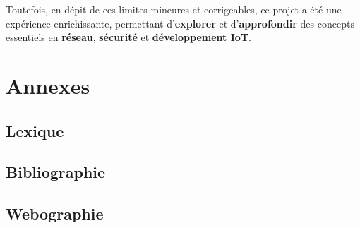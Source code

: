 \documentclass[10pt, a4paper]{report}
\begin{document}
	Toutefois, en dépit de ces limites mineures et corrigeables, ce projet a été une expérience enrichissante, permettant d’\textbf{explorer} et d’\textbf{approfondir} des concepts essentiels en \textbf{réseau}, \textbf{sécurité} et \textbf{développement IoT}.	
	
	\appendix
	\chapter{Annexes}
	\section{Lexique}
	\section{Bibliographie}
	\section{Webographie}
	
	
	
		
	
	\nocite{*}
	
	
	
	\clearpage
	
	\printglossaries
	
	
\end{document}
